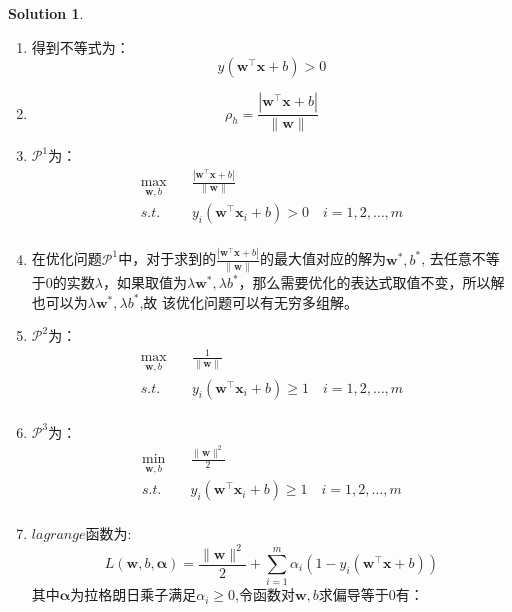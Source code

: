 \documentclass[a4paper,UTF8]{article}
\theoremstyle{definition}
\newtheorem*{solution}{Solution}
\begin{document}
\begin{solution}
	\begin{enumerate}[(1)]
		\item
		      得到不等式为：
		      \[y(\mathbf{w}^{\top}\mathbf{x}+b)>0\]
		\item
		      \[\rho_h = \frac{|\mathbf{w}^{\top}\mathbf{x}+b|}{\|\mathbf{w}\|}\]
		\item
		      $\mathcal{P}^{1}$为：
		      \begin{align*}
			      \mathop{max}\limits_{\mathbf{w},b} & \quad \frac{|\mathbf{w}^{\top}\mathbf{x}+b|}{\|\mathbf{w}\|}        \\
			      s.t.                               & \quad y_i(\mathbf{w}^{\top}\mathbf{x}_i+b)> 0\quad i = 1,2,\ldots,m \\
		      \end{align*}
		\item
		      在优化问题$\mathcal{P}^1$中，对于求到的$\frac{|\mathbf{w}^{\top}\mathbf{x}+b|}{\|\mathbf{w}\|}$的最大值对应的解为$\mathbf{w}^*,b^*$,
		      去任意不等于0的实数$\lambda$，如果取值为$\lambda\mathbf{w}^*,\lambda b^*$，那么需要优化的表达式取值不变，所以解也可以为$\lambda\mathbf{w}^*,\lambda b^*$,故
		      该优化问题可以有无穷多组解。
		\item
		      $\mathcal{P}^2$为：
		      \begin{align*}
			      \mathop{max}\limits_{\mathbf{w},b} & \quad \frac{1}{\|\mathbf{w}\|}                                         \\
			      s.t.                               & \quad y_i(\mathbf{w}^{\top}\mathbf{x}_i+b)\geq 1\quad i = 1,2,\ldots,m \\
		      \end{align*}
		\item
		      $\mathcal{P}^3$为：
		      \begin{align*}
			      \mathop{min}\limits_{\mathbf{w},b} & \quad \frac{\|\mathbf{w}\|^2}{2}                                       \\
			      s.t.                               & \quad y_i(\mathbf{w}^{\top}\mathbf{x}_i+b)\geq 1\quad i = 1,2,\ldots,m \\
		      \end{align*}
		\item
		      $lagrange$函数为:
		      \[L(\mathbf{w},b,\bm{\alpha}) = \frac{\|\mathbf{w}\|^2}{2}+\sum\limits_{i=1}^m\alpha_i(1-y_i(\mathbf{w}^{\top}\mathbf{x}+b))\]
		      其中$\bm{\alpha}$为拉格朗日乘子满足$\alpha_i\geq0$,令函数对$\mathbf{w},b$求偏导等于0有：

\end{enumerate}
\end{solution}
\end{document}

